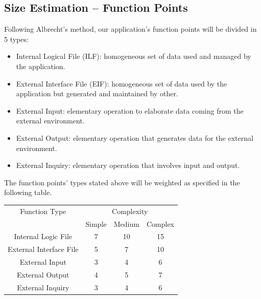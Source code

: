 \documentclass{article}
\begin{document}
\subsection{Size Estimation -- Function Points}
Following Albrecht's method, our application's function points
will be divided in 5 types:
\begin{itemize}
	\item Internal Logical File (ILF): homogeneous set of data used
	and managed by the application.
	\item External Interface File (EIF): homogeneous set of data 
	used by the application but generated and maintained by other.
	\item External Input: elementary operation to elaborate data
	coming from the external environment.
	\item External Output: elementary operation that generates data
	for the external environment.
	\item External Inquiry: elementary operation that involves
	input and output.
\end{itemize}
The function points' types stated above will be weighted as 
specified in the following table.
\begin{center}
\begin{table}[H]
\begin{tabular}{|*4{c|}}
\hline
Function Type&\multicolumn{3}{c|}{Complexity}\\
\cline{2-4}
&Simple&Medium&Complex\\
\hline
\hline
Internal Logic File & 7 & 10 & 15 \\
\hline
External Interface File & 5 & 7 & 10 \\
\hline
External Input & 3 & 4 & 6 \\
\hline
External Output & 4 & 5 & 7 \\
\hline
External Inquiry & 3 & 4 & 6 \\
\hline
\end{tabular}
\end{table}
\end{center}
\end{document}
